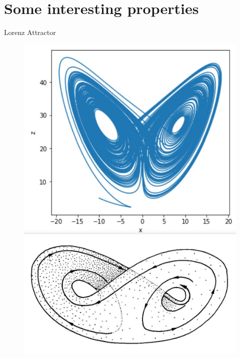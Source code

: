 \documentclass[10pt,xcolor={table,dvipsnames},t]{beamer}
\begin{document}
\section{Some interesting properties}

\begin{frame}{Lorenz Attractor}
	
	\begin{figure}[h]
		\begin{minipage}[c]{.46\linewidth}
			\centering
			\includegraphics[width=\textwidth]{images/butterfly.jpg}
		\end{minipage}
		\hfill
		\begin{minipage}[c]{.46\linewidth}
			\centering
			\includegraphics[width=\textwidth]{images/butterfly3D.jpg}
		\end{minipage}
	\end{figure}
	
\end{frame}
\end{document}

